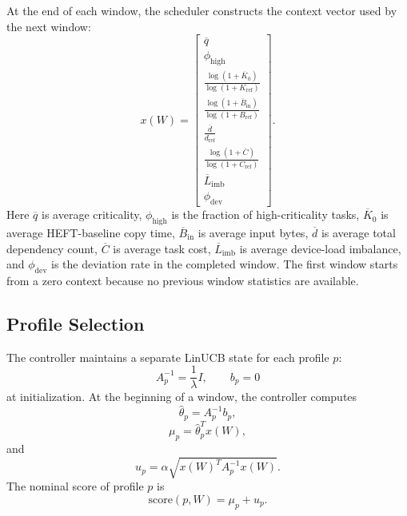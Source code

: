 At the end of each window, the scheduler constructs the context vector used by the next window:
\begin{equation}
x(W)=
\left[
\begin{array}{c}
\overline{q} \\
\phi_{\mathrm{high}} \\
\displaystyle \frac{\log(1+\overline{K}_0)}{\log(1+K_{\mathrm{ref}})} \\
\displaystyle \frac{\log(1+\overline{B}_{\mathrm{in}})}{\log(1+B_{\mathrm{ref}})} \\
\displaystyle \frac{\overline{d}}{d_{\mathrm{ref}}} \\
\displaystyle \frac{\log(1+\overline{C})}{\log(1+C_{\mathrm{ref}})} \\
\overline{L}_{\mathrm{imb}} \\
\phi_{\mathrm{dev}}
\end{array}
\right].
\label{eq:bandit-context}
\end{equation}
Here $\overline{q}$ is average criticality, $\phi_{\mathrm{high}}$ is the fraction of high-criticality tasks, $\overline{K}_0$ is average HEFT-baseline copy time, $\overline{B}_{\mathrm{in}}$ is average input bytes, $\overline{d}$ is average total dependency count, $\overline{C}$ is average task cost, $\overline{L}_{\mathrm{imb}}$ is average device-load imbalance, and $\phi_{\mathrm{dev}}$ is the deviation rate in the completed window. The first window starts from a zero context because no previous window statistics are available.

\subsection{Profile Selection}
\label{subsec:methods-profile-selection}

The controller maintains a separate LinUCB state for each profile $p$:
\begin{equation}
A_p^{-1}=\frac{1}{\lambda}I,
\qquad
b_p=0
\end{equation}
at initialization. At the beginning of a window, the controller computes
\begin{equation}
\widehat{\theta}_p=A_p^{-1}b_p,
\end{equation}
\begin{equation}
\mu_p=\widehat{\theta}_p^{T}x(W),
\end{equation}
and
\begin{equation}
u_p=\alpha\sqrt{x(W)^TA_p^{-1}x(W)}.
\end{equation}
The nominal score of profile $p$ is
\begin{equation}
\mathrm{score}(p,W)=\mu_p+u_p.
\end{equation}

